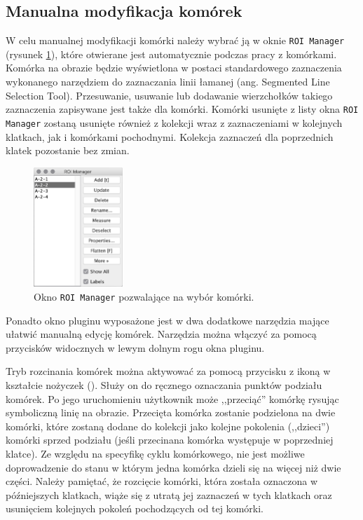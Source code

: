 \documentclass[declaration,shortabstract,mgr]{iithesis}
\begin{document}
\subsection{Manualna modyfikacja komórek}
\label{sec:user-manual-modifications}

W celu manualnej modyfikacji komórki należy wybrać ją w oknie \texttt{ROI Manager} (rysunek \ref{fig:ui-roi-manager}), które otwierane jest automatycznie podczas pracy z komórkami.
Komórka na obrazie będzie wyświetlona w postaci standardowego zaznaczenia wykonanego narzędziem do zaznaczania linii łamanej (ang. Segmented Line Selection Tool)\cite{imagej:segmented-line}.
Przesuwanie, usuwanie lub dodawanie wierzchołków takiego zaznaczenia zapisywane jest także dla komórki.
Komórki usunięte z listy okna \texttt{ROI Manager} zostaną usunięte również z kolekcji wraz z zaznaczeniami w kolejnych klatkach, jak i komórkami pochodnymi.
Kolekcja zaznaczeń dla poprzednich klatek pozostanie bez zmian.

\begin{figure}
  \centering
  \includegraphics[width=0.3\textwidth]{images/ui-roi-manager.png}
  \caption{Okno \texttt{ROI Manager} pozwalające na wybór komórki.}
  \label{fig:ui-roi-manager}
\end{figure}

Ponadto okno pluginu wyposażone jest w dwa dodatkowe narzędzia mające ułatwić manualną edycję komórek. Narzędzia można włączyć za pomocą przycisków widocznych w lewym dolnym rogu okna pluginu.

Tryb rozcinania komórek można aktywować za pomocą przycisku z ikoną w kształcie nożyczek ().
Służy on do ręcznego oznaczania punktów podziału komórek. Po jego uruchomieniu użytkownik może ,,przeciąć'' komórkę rysując symboliczną linię na obrazie.
Przecięta komórka zostanie podzielona na dwie komórki, które zostaną dodane do kolekcji jako kolejne pokolenia (,,dzieci'') komórki sprzed podziału (jeśli przecinana komórka występuje w poprzedniej klatce).
Ze względu na specyfikę cyklu komórkowego, nie jest możliwe doprowadzenie do stanu w którym jedna komórka dzieli się na więcej niż dwie części.
Należy pamiętać, że rozcięcie komórki, która została oznaczona w późniejszych klatkach, wiąże się z utratą jej zaznaczeń w tych klatkach oraz usunięciem kolejnych pokoleń pochodzących od tej komórki.
\end{document}
